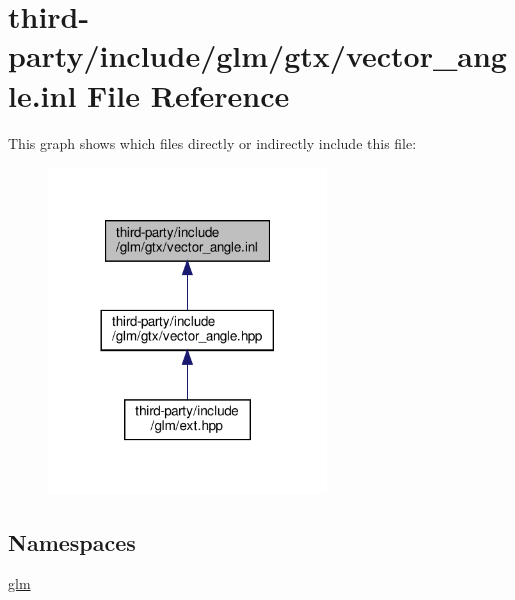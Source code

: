 \hypertarget{vector__angle_8inl}{}\section{third-\/party/include/glm/gtx/vector\+\_\+angle.inl File Reference}
\label{vector__angle_8inl}
This graph shows which files directly or indirectly include this file\+:
\nopagebreak
\begin{figure}[H]
\begin{center}
\leavevmode
\includegraphics[width=209pt]{vector__angle_8inl__dep__incl}
\end{center}
\end{figure}
\subsection*{Namespaces}
\begin{DoxyCompactItemize}
\item 
 \hyperlink{namespaceglm}{glm}
\end{DoxyCompactItemize}
